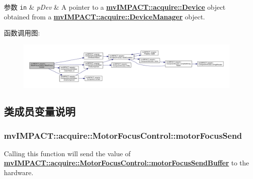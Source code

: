 \begin{DoxyParams}[1]{参数}
\mbox{\tt in}  & {\em p\+Dev} & A pointer to a {\bfseries \hyperlink{classmv_i_m_p_a_c_t_1_1acquire_1_1_device}{mv\+I\+M\+P\+A\+C\+T\+::acquire\+::\+Device}} object obtained from a {\bfseries \hyperlink{classmv_i_m_p_a_c_t_1_1acquire_1_1_device_manager}{mv\+I\+M\+P\+A\+C\+T\+::acquire\+::\+Device\+Manager}} object. \\
\hline
\end{DoxyParams}


函数调用图\+:
\nopagebreak
\begin{figure}[H]
\begin{center}
\leavevmode
\includegraphics[width=350pt]{classmv_i_m_p_a_c_t_1_1acquire_1_1_motor_focus_control_a0f790215b1eadcd259f7ada4257ab70c_cgraph}
\end{center}
\end{figure}




\subsection{类成员变量说明}
\hypertarget{classmv_i_m_p_a_c_t_1_1acquire_1_1_motor_focus_control_a52ccaf1b60154618b17112d50209cee3}{
\subsubsection[{motor\+Focus\+Send}]{ mv\+I\+M\+P\+A\+C\+T\+::acquire\+::\+Motor\+Focus\+Control\+::motor\+Focus\+Send}}\label{classmv_i_m_p_a_c_t_1_1acquire_1_1_motor_focus_control_a52ccaf1b60154618b17112d50209cee3}


Calling this function will send the value of {\bfseries \hyperlink{classmv_i_m_p_a_c_t_1_1acquire_1_1_motor_focus_control_a4670bcf5c3ffe82afc04de1deaea292e}{mv\+I\+M\+P\+A\+C\+T\+::acquire\+::\+Motor\+Focus\+Control\+::motor\+Focus\+Send\+Buffer}} to the hardware. 

